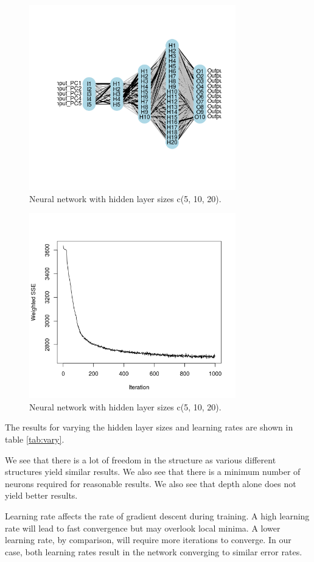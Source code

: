 \documentclass[paper=a4, fontsize=11pt]{scrartcl} %
\begin{document}
	\begin{figure}[h]
		\centering
		\includegraphics[width=0.8\textwidth]{nn.png}
		\caption{Neural network with hidden layer sizes c(5, 10, 20).}
		\label{fig:nn}
	\end{figure}

	\begin{figure}[h]
		\centering
		\includegraphics[width=0.8\textwidth]{iterr.png}
		\caption{Neural network with hidden layer sizes c(5, 10, 20).}
		\label{fig:iterr}
	\end{figure}

	\newpage
	The results for varying the hidden layer sizes and learning rates are shown in table \ref{tab:vary}. \par
	We see that there is a lot of freedom in the structure as various different structures yield similar results. We also see that there is a minimum number of neurons required for reasonable results. We also see that depth alone does not yield better results.\par
	Learning rate affects the rate of gradient descent during training. A high learning rate will lead to fast convergence but may overlook local minima. A lower learning rate, by comparison, will require more iterations to converge. In our case, both learning rates result in the network converging to similar error rates.
\end{document}

